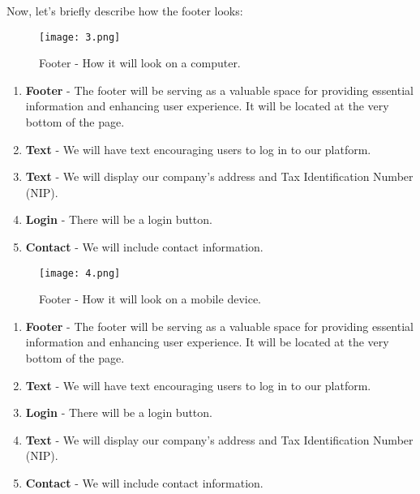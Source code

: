 \documentclass{article}
\begin{document}
Now, let's briefly describe how the footer looks:
\begin{figure}[h]
    \centering
    \texttt{[image: 3.png]}
    \caption{Footer - How it will look on a computer.}
    \label{fig:enter-label}
\end{figure}


\begin{enumerate}
    \item \textbf{Footer} - The footer will be serving as a valuable space for providing essential information and enhancing user experience. It will be located at the very bottom of the page.
    \item \textbf{Text} - We will have text encouraging users to log in to our platform.
    \item \textbf{Text} - We will display our company's address and Tax Identification Number (NIP).
    \item \textbf{Login}  - There will be a login button.
    \item \textbf{Contact} -  We will include contact information.
\end{enumerate} 

\begin{figure}[h]
    \centering
    \texttt{[image: 4.png]}
    \caption{Footer - How it will look on a mobile device.}
    \label{fig:enter-label}
\end{figure}

\begin{enumerate}
    \item \textbf{Footer} - The footer will be serving as a valuable space for providing essential information and enhancing user experience. It will be located at the very bottom of the page.
    \item \textbf{Text} - We will have text encouraging users to log in to our platform.
    \item \textbf{Login}  - There will be a login button.
    \item \textbf{Text} - We will display our company's address and Tax Identification Number (NIP).
    \item \textbf{Contact} -  We will include contact information.
\end{enumerate} 
\end{document}

